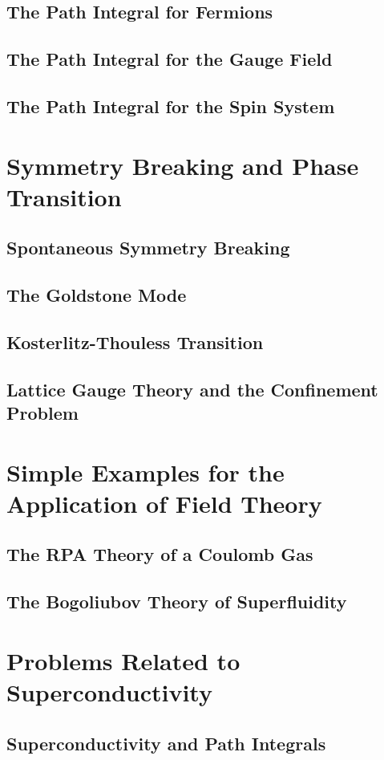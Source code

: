 \documentclass[twoside,11pt]{report}
\begin{document}
\section{The Path Integral for Fermions}
\section{The Path Integral for the Gauge Field}
\section{The Path Integral for the Spin System}
\chapter{Symmetry Breaking and Phase Transition}
\section{Spontaneous Symmetry Breaking}
\section{The Goldstone Mode}
\section{Kosterlitz-Thouless Transition}
\section{Lattice Gauge Theory and the Confinement Problem}
\chapter{Simple Examples for the Application of Field Theory}
\section{The RPA Theory of a Coulomb Gas}
\section{The Bogoliubov Theory of Superfluidity}
\chapter{Problems Related to Superconductivity}
\section{Superconductivity and Path Integrals}
\end{document}
